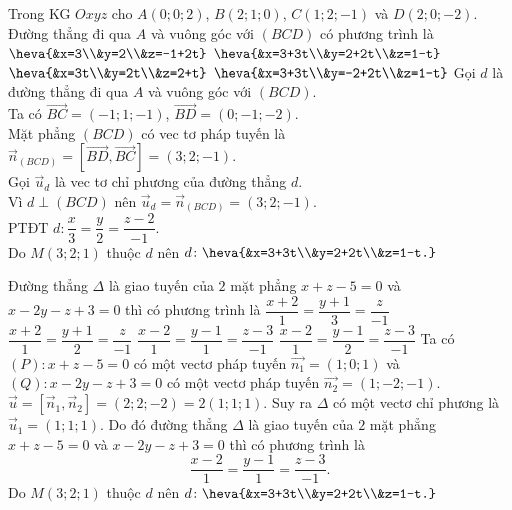 \begin{ex}%
	Trong KG $Oxyz$ cho $A(0;0;2)$, $B(2;1;0)$, $C(1;2;-1)$ và $D(2;0;-2)$. Đường thẳng đi qua $A$ và vuông góc với $(BCD)$ có phương trình là
	\choice
	{$\heva{&x=3\\&y=2\\&z=-1+2t}$}
	{\True $\heva{&x=3+3t\\&y=2+2t\\&z=1-t}$}
	{$\heva{&x=3t\\&y=2t\\&z=2+t}$}
	{$\heva{&x=3+3t\\&y=-2+2t\\&z=1-t}$}
	\loigiai
	{
		Gọi $d$ là đường thẳng đi qua $A$ và vuông góc với $(BCD)$.\\
		Ta có $\overrightarrow{BC}=(-1;1;-1)$, $\overrightarrow{BD}=(0;-1;-2)$.\\
		Mặt phẳng $(BCD)$ có vec tơ pháp tuyến là $\vec{n}_{(BCD)}=\left[\overrightarrow{BD},\overrightarrow{BC}\right]=(3;2;-1)$.\\
		Gọi $\vec{u}_{d}$ là vec tơ chỉ phương của đường thẳng $d$.\\
		Vì $d\perp(BCD)$ nên $\overrightarrow{u}_{d}=\vec{n}_{(BCD)}=(3;2;-1)$.\\
		PTĐT $d\colon\dfrac{x}{3}=\dfrac{y}{2}=\dfrac{z-2}{-1}$.\\
		Do $M(3;2;1)$ thuộc $d$ nên $d\colon\heva{&x=3+3t\\&y=2+2t\\&z=1-t.}$
	}
\end{ex}
\begin{ex}%
	Đường thẳng $\Delta$ là giao tuyến của $2$ mặt phẳng $x+z-5=0$ và $x-2y-z+3=0$ thì có phương trình là
	\choice
	{$\dfrac{x+2}{1}=\dfrac{y+1}{3}=\dfrac{z}{-1}$}
	{$\dfrac{x+2}{1}=\dfrac{y+1}{2}=\dfrac{z}{-1}$}
	{\True $\dfrac{x-2}{1}=\dfrac{y-1}{1}=\dfrac{z-3}{-1}$}
	{$\dfrac{x-2}{1}=\dfrac{y-1}{2}=\dfrac{z-3}{-1}$}
	\loigiai
	{
		Ta có $(P)\colon x+z-5=0$ có một vectơ pháp tuyến $\overrightarrow{n_{1}}=(1;0;1)$ và $(Q)\colon x-2y-z+3=0$ có một vectơ pháp tuyến $\overrightarrow{n_{2}}=(1;-2;-1)$.\\
		$\vec{u}=\left[\overrightarrow{n}_{1},\overrightarrow{n}_{2}\right]=(2;2;-2)=2(1;1;1)$.
		Suy ra $\Delta$ có một vectơ chỉ phương là $\vec{u}_{1}=(1;1;1)$.
		Do đó đường thẳng $\Delta$ là giao tuyến của $2$ mặt phẳng $x+z-5=0$ và $x-2y-z+3=0$ thì có phương trình là 
		$$\dfrac{x-2}{1}=\dfrac{y-1}{1}=\dfrac{z-3}{-1}.$$
		Do $M(3;2;1)$ thuộc $d$ nên $d\colon\heva{&x=3+3t\\&y=2+2t\\&z=1-t.}$
	}
\end{ex}
